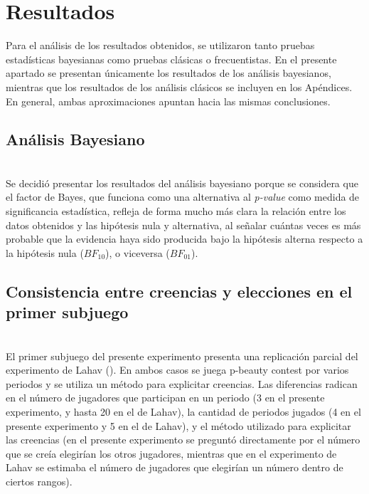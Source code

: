\chapter{Resultados} %
\label{Cap_Res} %

Para el análisis de los resultados obtenidos, se utilizaron tanto pruebas estadísticas bayesianas como pruebas clásicas o frecuentistas. En el presente apartado se presentan únicamente los resultados de los análisis bayesianos, mientras que los resultados de los análisis clásicos se incluyen en los Apéndices. En general, ambas aproximaciones apuntan hacia las mismas conclusiones.\\

\section{Análisis Bayesiano}\\

Se decidió presentar los resultados del análisis bayesiano porque se considera que el factor de Bayes, que funciona como una alternativa al \textit{p-value} como medida de significancia estadística, refleja de forma mucho más clara la  relación entre los datos obtenidos y las hipótesis nula y alternativa, al señalar cuántas veces es más probable que la evidencia haya sido producida bajo la hipótesis alterna respecto a la hipótesis nula ($BF_{10}$), o viceversa ($BF_{01}$).\\

\section{Consistencia entre creencias y elecciones en el primer subjuego}\\

El primer subjuego del presente experimento presenta una replicación parcial del experimento de Lahav (\citeyear{Lahav}). En ambos casos se juega p-beauty contest por varios periodos y se utiliza un método para explicitar creencias. Las diferencias radican en el número de jugadores que participan en un periodo (3 en el presente experimento, y hasta 20 en el de Lahav), la cantidad de periodos jugados (4 en el presente experimento y 5 en el de Lahav), y el método utilizado para explicitar las creencias (en el presente experimento se preguntó directamente por el número que se creía elegirían los otros jugadores, mientras que en el experimento de Lahav se estimaba el número de jugadores que elegirían un número dentro de ciertos rangos).\\

